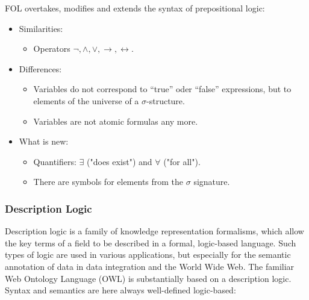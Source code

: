 FOL overtakes, modifies and extends the syntax of prepositional logic:
\begin{itemize}
    \item Similarities:
    \begin{itemize}
        \item Operators $\neg, \wedge, \vee, \rightarrow, \leftrightarrow$.
    \end{itemize}
    \item Differences:
    \begin{itemize}
        \item Variables do not correspond to “true” oder “false” expressions, but to elements of the universe of a  $\sigma$-structure.
        \item Variables are not atomic formulas any more.
    \end{itemize}
    \item What is new:
    \begin{itemize}
        \item Quantifiers: $\exists$ ("does exist") and $\forall$ ("for all").
        \item There are symbols for elements from the $\sigma$ signature.
    \end{itemize}
\end{itemize}
\subsubsection{Description Logic}
Description logic is a family of knowledge representation formalisms, which allow the key terms of a field to be described in a formal, logic-based language. Such types of logic are used in various applications, but especially for the semantic annotation of data in data integration and the World Wide Web. The familiar Web Ontology Language (OWL) is substantially based on a description logic. Syntax and semantics are here always well-defined logic-based:

